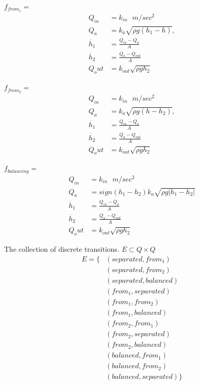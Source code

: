 \documentclass[letterpaper]{article}
\begin{document}
$f_{from_1} = $
\begin{align}
  Q_{in} &= k_{in} \mbox{ $m/sec^2$ } \\
  Q_a &= k_{a} \sqrt{\rho g (h_1 - h)}, \\ 
  \dot{h_1} &= \frac{Q_{in} - Q_a}{A} \\
  \dot{h_2} &= \frac{Q_a - Q_{out}}{A} \\
  Q_out &= k_{out} \sqrt{\rho g h_2} 
\end{align} 

$f_{from_2} = $
\begin{align}
  Q_{in} &= k_{in} \mbox{ $m/sec^2$ } \\
  Q_a &= k_{a} \sqrt{\rho g (h - h_2)}, \\ 
  \dot{h_1} &= \frac{Q_{in} - Q_a}{A} \\
  \dot{h_2} &= \frac{Q_a - Q_{out}}{A} \\
  Q_out &= k_{out} \sqrt{\rho g h_2} 
\end{align} 

$f_{balancing} = $
\begin{align}
  Q_{in} &= k_{in} \mbox{ $m/sec^2$ } \\
  Q_a &= sign(h_1 - h_2) k_a \sqrt{\rho g |h_1 - h_2|} \\ 
  \dot{h_1} &= \frac{Q_{in} - Q_a}{A} \\
  \dot{h_2} &= \frac{Q_a - Q_{out}}{A} \\
  Q_out &= k_{out} \sqrt{\rho g h_2} 
\end{align} 

The collection of discrete transitions.
$E \subset Q \times Q$
\begin{align}
E = \{ 
  & ( separated, from_1 ) \\
  & ( separated, from_2 ) \\
  & ( separated, balanced ) \\
  & ( from_1, separated ) \\
  & ( from_1, from_2 ) \\
  & ( from_1, balanced ) \\
  & ( from_2, from_1 ) \\
  & ( from_2, separated ) \\
  & ( from_2, balanced ) \\
  & ( balanced, from_1 ) \\
  & ( balanced, from_2 ) \\
  & ( balanced, separated )  \}
\end{align}
\end{document}

